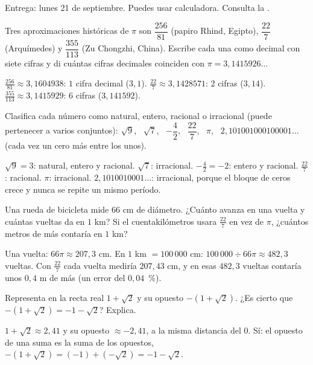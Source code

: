 \documentclass[11pt]{article}
\begin{document}
\encabezado

\begin{instrucciones}
Entrega: lunes 21 de septiembre. Puedes usar calculadora. Consulta la
.
\end{instrucciones}

\begin{preguntas}

\pregunta Tres aproximaciones históricas de $\pi$ son $\dfrac{256}{81}$ (papiro Rhind,
Egipto), $\dfrac{22}{7}$ (Arquímedes) y $\dfrac{355}{113}$ (Zu Chongzhi, China). Escribe cada
una como decimal con siete cifras y di cuántas cifras decimales coinciden con
$\pi = 3{,}1415926\ldots$
\espacio{2.3cm}
\begin{solucion}
$\frac{256}{81} \approx 3{,}1604938$: $1$ cifra decimal ($3{,}1$).
$\frac{22}{7} \approx 3{,}1428571$: $2$ cifras ($3{,}14$).
$\frac{355}{113} \approx 3{,}1415929$: $6$ cifras ($3{,}141592$).
\end{solucion}

\pregunta Clasifica cada número como natural, entero, racional o irracional (puede pertenecer
a varios conjuntos): $\sqrt{9}$, \ $\sqrt{7}$, \ $-\dfrac{4}{2}$, \ $\dfrac{22}{7}$, \ $\pi$,
\ $2{,}101001000100001\ldots$ (cada vez un cero más entre los unos).
\espacio{2.3cm}
\begin{solucion}
$\sqrt{9} = 3$: natural, entero y racional. $\sqrt{7}$: irracional. $-\frac{4}{2} = -2$: entero
y racional. $\frac{22}{7}$: racional. $\pi$: irracional. $2{,}1010010001\ldots$: irracional,
porque el bloque de ceros crece y nunca se repite un mismo período.
\end{solucion}

\pregunta Una rueda de bicicleta mide $66$ cm de diámetro. ¿Cuánto avanza en una vuelta y
cuántas vueltas da en $1$ km? Si el cuentakilómetros usara $\frac{22}{7}$ en vez de $\pi$,
¿cuántos metros de más contaría en $1$ km?
\espacio{2.8cm}
\begin{solucion}
Una vuelta: $66\pi \approx 207{,}3$ cm. En $1$ km $= 100\,000$ cm:
$100\,000 \div 66\pi \approx 482{,}3$ vueltas. Con $\frac{22}{7}$ cada vuelta mediría
$207{,}43$ cm, y en esas $482{,}3$ vueltas contaría unos $0{,}4$ m de más (un error del
$0{,}04$~\%).
\end{solucion}

\pregunta Representa en la recta real $1 + \sqrt{2}$ y su opuesto $-(1 + \sqrt{2})$. ¿Es
cierto que $-(1 + \sqrt{2}) = -1 - \sqrt{2}$? Explica.
\espacio{2.3cm}
\begin{solucion}
$1 + \sqrt{2} \approx 2{,}41$ y su opuesto $\approx -2{,}41$, a la misma distancia del $0$.
Sí: el opuesto de una suma es la suma de los opuestos,
$-(1 + \sqrt{2}) = (-1) + (-\sqrt{2}) = -1 - \sqrt{2}$.
\end{solucion}

\end{preguntas}
\end{document}
